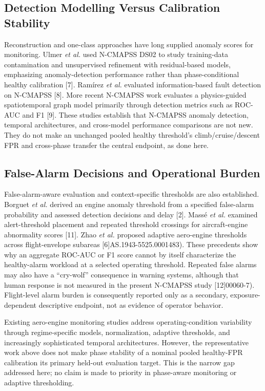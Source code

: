 \documentclass[10pt,twocolumn]{article}
\begin{document}
\subsection{Detection Modelling Versus Calibration Stability}\label{detection-modelling-versus-calibration-stability}

Reconstruction and one-class approaches have long supplied anomaly scores for monitoring. Ulmer \emph{et al.} used N-CMAPSS DS02 to study training-data contamination and unsupervised refinement with residual-based models, emphasizing anomaly-detection performance rather than phase-conditional healthy calibration {[}7{]}. Ramírez \emph{et al.} evaluated information-based fault detection on N-CMAPSS {[}8{]}. More recent N-CMAPSS work evaluates a physics-guided spatiotemporal graph model primarily through detection metrics such as ROC-AUC and F1 {[}9{]}. These studies establish that N-CMAPSS anomaly detection, temporal architectures, and cross-model performance comparisons are not new. They do not make an unchanged pooled healthy threshold's climb/cruise/descent FPR and cross-phase transfer the central endpoint, as done here.

\subsection{False-Alarm Decisions and Operational Burden}\label{false-alarm-decisions-and-operational-burden}

False-alarm-aware evaluation and context-specific thresholds are also established. Borguet \emph{et al.} derived an engine anomaly threshold from a specified false-alarm probability and assessed detection decisions and delay {[}2{]}. Massé \emph{et al.} examined alert-threshold placement and repeated threshold crossings for aircraft-engine abnormality scores {[}11{]}. Zhao \emph{et al.} proposed adaptive aero-engine thresholds across flight-envelope subareas {[}6{]}AS.1943-5525.0001483). These precedents show why an aggregate ROC-AUC or F1 score cannot by itself characterize the healthy-alarm workload at a selected operating threshold. Repeated false alarms may also have a ``cry-wolf'' consequence in warning systems, although that human response is not measured in the present N-CMAPSS study {[}12{]}00060-7). Flight-level alarm burden is consequently reported only as a secondary, exposure-dependent descriptive endpoint, not as evidence of operator behavior.

Existing aero-engine monitoring studies address operating-condition variability through regime-specific models, normalization, adaptive thresholds, and increasingly sophisticated temporal architectures. However, the representative work above does not make phase stability of a nominal pooled healthy-FPR calibration its primary held-out evaluation target. This is the narrow gap addressed here; no claim is made to priority in phase-aware monitoring or adaptive thresholding.
\end{document}
